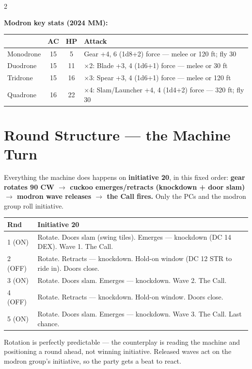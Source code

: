 \documentclass[10pt,letterpaper]{article}
\begin{document}
\begin{multicols}{2}
\vspace{4pt}

\textbf{Modron key stats (2024 MM):}

\begin{tabularx}{\columnwidth}{@{}lccX@{}}
\toprule
& \textbf{AC} & \textbf{HP} & \textbf{Attack} \\
\midrule
Monodrone & 15 & 5 & Gear +4, 6 (1d8+2) force --- melee or 120 ft; fly 30 \\
Duodrone & 15 & 11 & $\times$2: Blade +3, 4 (1d6+1) force --- melee or 30 ft \\
Tridrone & 15 & 16 & $\times$3: Spear +3, 4 (1d6+1) force --- melee or 120 ft \\
Quadrone & 16 & 22 & $\times$4: Slam/Launcher +4, 4 (1d4+2) force --- 320 ft; fly 30 \\
\bottomrule
\end{tabularx}

\section*{Round Structure --- the Machine Turn}

Everything the machine does happens on \textbf{initiative 20}, in this fixed order: \textbf{gear rotates 90\textdegree{} CW $\to$ cuckoo emerges/retracts (knockdown + door slam) $\to$ modron wave releases $\to$ the Call fires.} Only the PCs and the modron group roll initiative.

\begin{tabularx}{\columnwidth}{@{}lX@{}}
\toprule
\textbf{Rnd} & \textbf{Initiative 20} \\
\midrule
1 (ON) & Rotate. Doors slam (swing tiles). Emerges --- knockdown (DC 14 DEX). Wave 1. The Call. \\
2 (OFF) & Rotate. Retracts --- knockdown. Hold-on window (DC 12 STR to ride in). Doors close. \\
3 (ON) & Rotate. Doors slam. Emerges --- knockdown. Wave 2. The Call. \\
4 (OFF) & Rotate. Retracts --- knockdown. Hold-on window. Doors close. \\
5 (ON) & Rotate. Doors slam. Emerges --- knockdown. Wave 3. The Call. Last chance. \\
\bottomrule
\end{tabularx}

\vspace{4pt}
Rotation is perfectly predictable --- the counterplay is reading the machine and positioning a round ahead, not winning initiative. Released waves act on the modron group's initiative, so the party gets a beat to react.


\end{multicols}
\end{document}
